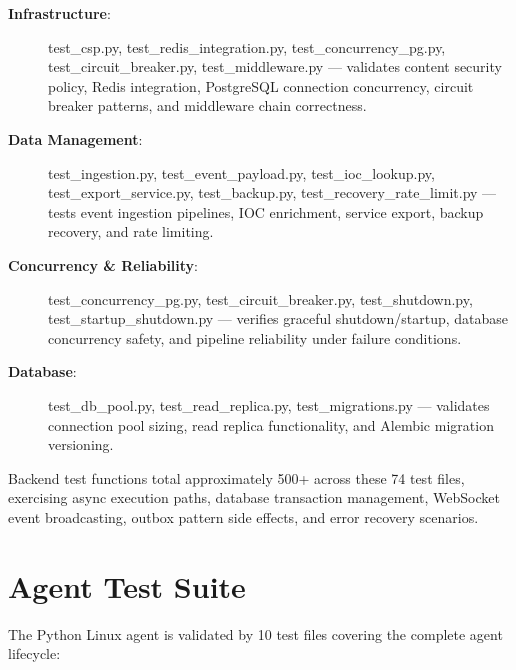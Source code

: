 \begin{description}
    \item[\textbf{Infrastructure}:] test\_csp.py, test\_redis\_integration.py, test\_concurrency\_pg.py, test\_circuit\_breaker.py, test\_middleware.py — validates content security policy, Redis integration, PostgreSQL connection concurrency, circuit breaker patterns, and middleware chain correctness.
    \item[\textbf{Data Management}:] test\_ingestion.py, test\_event\_payload.py, test\_ioc\_lookup.py, test\_export\_service.py, test\_backup.py, test\_recovery\_rate\_limit.py — tests event ingestion pipelines, IOC enrichment, service export, backup recovery, and rate limiting.
    \item[\textbf{Concurrency \& Reliability}:] test\_concurrency\_pg.py, test\_circuit\_breaker.py, test\_shutdown.py, test\_startup\_shutdown.py — verifies graceful shutdown/startup, database concurrency safety, and pipeline reliability under failure conditions.
    \item[\textbf{Database}:] test\_db\_pool.py, test\_read\_replica.py, test\_migrations.py — validates connection pool sizing, read replica functionality, and Alembic migration versioning.
\end{description}

Backend test functions total approximately 500+ across these 74 test files, exercising async execution paths, database transaction management, WebSocket event broadcasting, outbox pattern side effects, and error recovery scenarios.

\section{Agent Test Suite}
The Python Linux agent is validated by 10 test files covering the complete agent lifecycle:

